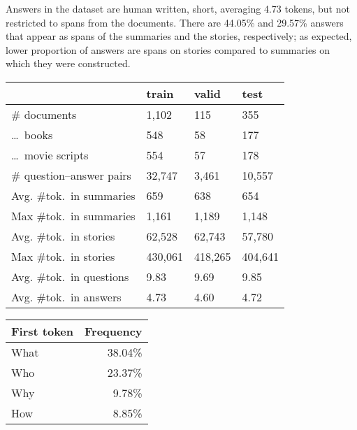\documentclass[11pt,letterpaper]{article}
\begin{document}
Answers in the dataset are human written, short, averaging 4.73 tokens, but not restricted to spans from the documents.
There are 44.05\% and 29.57\% answers that appear as spans of the summaries and the stories, respectively; as expected, lower proportion of answers are spans on stories compared to summaries on which they were constructed.


\begin{table*}[t]
\begin{minipage}[t]{.48\linewidth}
\small
\footnotesize
\centering
\newcommand{\tokens}{tok.}
\begin{tabular}[t]{@{}llll@{}}
    \toprule
                                &  \textbf{train}   &  \textbf{valid}   &   \textbf{test}    \\
    \midrule
    \# documents                & 1,102    & 115      & 355       \\
    \dots\ books                & 548      & 58       & 177      \\
    \dots\ movie scripts        & 554      & 57       & 178       \\
    \# question--answer pairs    & 32,747   & 3,461    & 10,557    \\
    Avg. \#\tokens\ in summaries & 659      & 638      & 654       \\
    Max  \#\tokens\ in summaries & 1,161     & 1,189   & 1,148    \\
    Avg. \#\tokens\ in stories   & 62,528   & 62,743   & 57,780   \\
    Max  \#\tokens\ in stories   & 430,061  & 418,265  & 404,641    \\
    Avg. \#\tokens\ in questions & 9.83     & 9.69     & 9.85       \\
    Avg. \#\tokens\ in answers   & 4.73     & 4.60     & 4.72       \\
    \bottomrule
\end{tabular}
\caption{NarrativeQA dataset statistics.} \label{tab:datasetstats}
\end{minipage}
\hfill
\begin{minipage}[t]{.25\linewidth}
\small
\footnotesize
\centering
\begin{tabular}[t]{@{}lr@{}}
    \toprule
    \textbf{First token} & \textbf{Frequency} \\
    \midrule
    What&	38.04\% \\
    Who&	23.37\% \\
    Why&	~9.78\% \\
    How&	~8.85\% \\

\end{tabular}
\end{minipage}
\end{table*}
\end{document}
